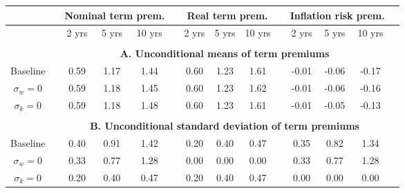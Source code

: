 \begin{tabular}{cccccccccccccc} \hline &&\multicolumn{3}{c}{Nominal term prem.}&&\multicolumn{3}{c}{Real term prem.}&&\multicolumn{3}{c}{Inflation risk prem.}\\ \hline &&2 yrs& 5 yrs& 10 yrs&&2 yrs& 5 yrs& 10 yrs&&2 yrs& 5 yrs& 10 yrs\\ \hline \\ && \multicolumn{11}{c}{\bf{A. Unconditional means of term premiums}}\\ \hline Baseline & & 0.59 & 1.17 & 1.44 &  & 0.60 & 1.23 & 1.61 &  & -0.01 & -0.06 & -0.17 \\ $\sigma_w=0$ & & 0.59 & 1.18 & 1.45 &  & 0.60 & 1.23 & 1.62 &  & -0.01 & -0.06 & -0.16 \\ $\sigma_k=0$ & & 0.59 & 1.18 & 1.48 &  & 0.60 & 1.23 & 1.61 &  & -0.01 & -0.05 & -0.13 \\  \hline \\ && \multicolumn{11}{c}{\bf{B. Unconditional standard deviation of term premiums}}\\ \hline Baseline & & 0.40 & 0.91 & 1.42 &  & 0.20 & 0.40 & 0.47 &  & 0.35 & 0.82 & 1.34 \\ $\sigma_w=0$ & & 0.33 & 0.77 & 1.28 &  & 0.00 & 0.00 & 0.00 &  & 0.33 & 0.77 & 1.28 \\ $\sigma_k=0$ & & 0.20 & 0.40 & 0.47 &  & 0.20 & 0.40 & 0.47 &  & 0.00 & 0.00 & 0.00 \\ \hline \end{tabular}